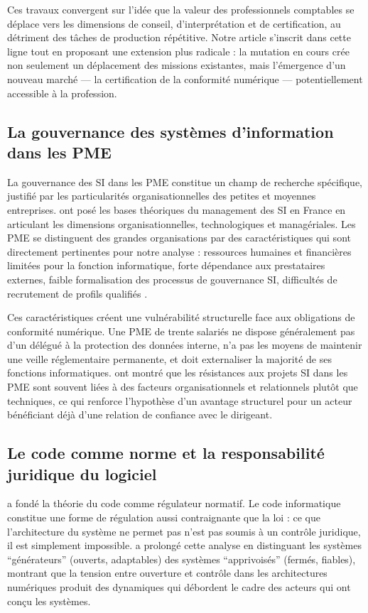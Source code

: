 \documentclass[12pt,a4paper]{article}
\begin{document}
Ces travaux convergent sur l'idée que la valeur des professionnels comptables se déplace vers les dimensions de conseil, d'interprétation et de certification, au détriment des tâches de production répétitive. Notre article s'inscrit dans cette ligne tout en proposant une extension plus radicale : la mutation en cours crée non seulement un déplacement des missions existantes, mais l'émergence d'un nouveau marché — la certification de la conformité numérique — potentiellement accessible à la profession.

\subsection{La gouvernance des systèmes d'information dans les PME}

La gouvernance des SI dans les PME constitue un champ de recherche spécifique, justifié par les particularités organisationnelles des petites et moyennes entreprises. \textcite{reix2011} ont posé les bases théoriques du management des SI en France en articulant les dimensions organisationnelles, technologiques et managériales. Les PME se distinguent des grandes organisations par des caractéristiques qui sont directement pertinentes pour notre analyse : ressources humaines et financières limitées pour la fonction informatique, forte dépendance aux prestataires externes, faible formalisation des processus de gouvernance SI, difficultés de recrutement de profils qualifiés \parencite{cragg1993, thong1999}.

Ces caractéristiques créent une vulnérabilité structurelle face aux obligations de conformité numérique. Une PME de trente salariés ne dispose généralement pas d'un délégué à la protection des données interne, n'a pas les moyens de maintenir une veille réglementaire permanente, et doit externaliser la majorité de ses fonctions informatiques. \textcite{meissonier2010} ont montré que les résistances aux projets SI dans les PME sont souvent liées à des facteurs organisationnels et relationnels plutôt que techniques, ce qui renforce l'hypothèse d'un avantage structurel pour un acteur bénéficiant déjà d'une relation de confiance avec le dirigeant.

\subsection{Le code comme norme et la responsabilité juridique du logiciel}

\textcite{lessig1999} a fondé la théorie du code comme régulateur normatif. Le code informatique constitue une forme de régulation aussi contraignante que la loi : ce que l'architecture du système ne permet pas n'est pas soumis à un contrôle juridique, il est simplement impossible. \textcite{zittrain2008} a prolongé cette analyse en distinguant les systèmes \enquote{générateurs} (ouverts, adaptables) des systèmes \enquote{apprivoisés} (fermés, fiables), montrant que la tension entre ouverture et contrôle dans les architectures numériques produit des dynamiques qui débordent le cadre des acteurs qui ont conçu les systèmes.
\end{document}
